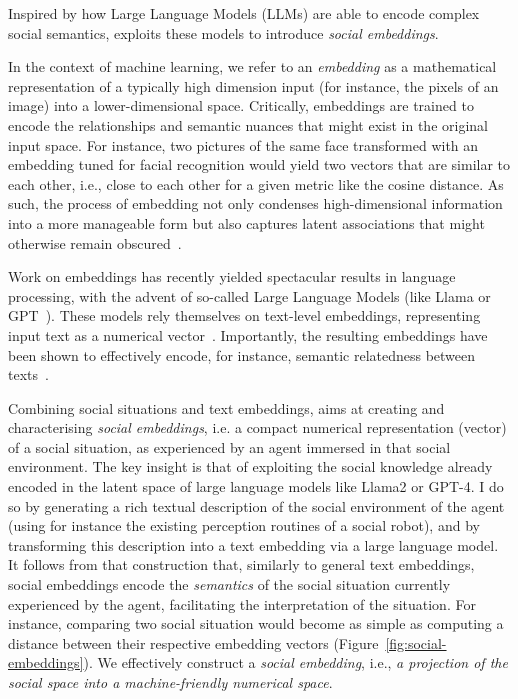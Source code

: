 Inspired by how Large Language Models (LLMs) are able to encode complex social
semantics, \project exploits these models to introduce \emph{social embeddings}.

In the context of machine learning, we refer to an \emph{embedding} as a
mathematical representation of a typically high dimension input (for instance,
the pixels of an image) into a lower-dimensional space. Critically, embeddings
are trained to encode the relationships and semantic nuances that might exist in
the original input space. For instance, two pictures of the same face
transformed with an embedding tuned for facial recognition would yield two
vectors that are similar to each other, i.e., close to each other for a given
metric like the cosine distance. As such, the process of embedding not
only condenses high-dimensional information into a more manageable form but also
captures latent associations that might otherwise remain
obscured~\cite{bengio2009learning}.

Work on embeddings has recently yielded spectacular results in language
processing, with the advent of so-called Large Language Models (like Llama or
GPT~\cite{devlin2019bert,wolf2020transformers}). These models rely themselves on
text-level embeddings, representing input text as a numerical
vector~\cite{reimers2019sentencebert,muennighoff2022sgpt}. Importantly, the
resulting embeddings have been shown to effectively encode, for instance,
semantic relatedness between texts~\cite{thakur2021beir}.

Combining social situations and text embeddings, \project aims at creating and
characterising \emph{social embeddings}, i.e. a compact numerical
representation (vector) of a social situation, as experienced by an agent
immersed in that social environment. 
The key insight is that of exploiting the social knowledge already encoded in
the latent space of large language models like Llama2 or GPT-4. I do so by
generating a rich textual description of the social environment of the agent
(using for instance the existing perception routines of a social robot), and by
transforming this description into a text embedding via a large language model.
It follows from that construction that, similarly to general text embeddings,
social embeddings encode the \emph{semantics} of the social situation currently
experienced by the agent, facilitating the interpretation of the situation. For
instance, comparing two social situation would become as simple as computing a
distance between their respective embedding vectors
(Figure~\ref{fig:social-embeddings}).  We effectively construct a \emph{social
embedding}, i.e., \emph{a projection of the social space into a machine-friendly
numerical space}.



